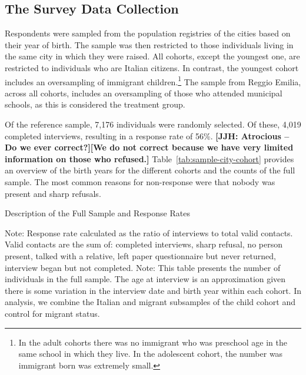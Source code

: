 \subsection{The Survey Data Collection}

Respondents were sampled from the population registries of the cities based on their year of birth. The sample was then restricted to those individuals living in the same city in which they were raised. All cohorts, except the youngest one, are restricted to individuals who are Italian citizens. In contrast, the youngest cohort includes an oversampling of immigrant children.\footnote{In the adult cohorts there was no immigrant who was preschool age in the same school in which they live. In the adolescent cohort, the number was immigrant born was extremely small.} The sample from Reggio Emilia, across all cohorts, includes an oversampling of those who attended municipal schools, as this is considered the treatment group.

Of the reference sample, 7,176 individuals were randomly selected. Of these, 4,019 completed interviews, resulting in a response rate of 56\%. \textbf{[JJH: Atrocious -- Do we ever correct?][We do not correct because we have very limited information on those who refused.]} Table~\ref{tab:sample-city-cohort} provides an overview of the birth years for the different cohorts and the counts of the full sample. The most common reasons for non-response were that nobody was present and sharp refusals. 

\begin{table}[H]
\centering
\begin{threeparttable}
	\caption{Description of the Full Sample and Response Rates}\label{tab:sample-response}
	
\begin{tablenotes}
\footnotesize
Note: Response rate calculated as the ratio of interviews to total valid contacts. Valid contacts are the sum of: completed interviews, sharp refusal, no person present, talked with a relative, left paper questionnaire but never returned, interview began but not completed. Note: This table presents the number of individuals in the full sample. The age at interview is an approximation given there is some variation in the interview date and birth year within each cohort. In analysis, we combine the Italian and migrant subsamples of the child cohort and control for migrant status.
\end{tablenotes}
\end{threeparttable}
\end{table}

